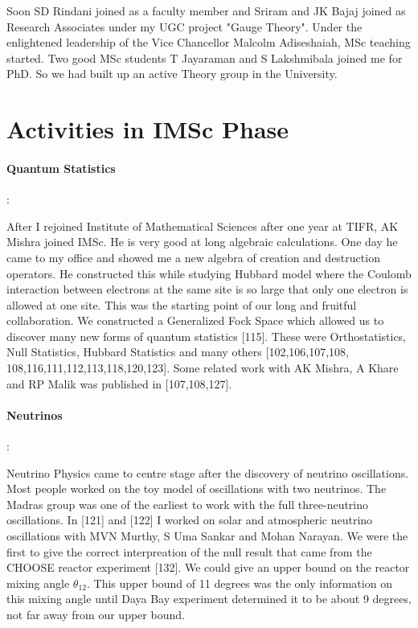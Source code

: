 Soon SD Rindani joined as a faculty member and Sriram and JK Bajaj 
joined as Research Associates under my UGC project "Gauge Theory". Under 
the enlightened leadership of the Vice Chancellor Malcolm Adiseshaiah, 
MSc teaching started. Two good MSc students T Jayaraman and S 
Lakshmibala joined me for PhD. So we had built up an active Theory group 
in the University.

\section*{Activities in IMSc Phase}

\paragraph{Quantum Statistics}:

After I rejoined Institute of Mathematical Sciences after one year at 
TIFR, AK Mishra joined IMSc. He is very good at long algebraic 
calculations. One day he came to my office and showed me a new algebra 
of creation and destruction operators. He constructed this while 
studying Hubbard model where the Coulomb interaction between electrons 
at the same site is so large that only one electron is allowed at one 
site. This was the starting point of our long and fruitful 
collaboration. We constructed a Generalized Fock Space which allowed us 
to discover many new forms of quantum statistics [115]. These were 
Orthostatistics, Null Statistics, Hubbard Statistics and many others 
[102,106,107,108, 108,116,111,112,113,118,120,123]. Some related work 
with AK Mishra, A Khare and RP Malik was published in [107,108,127].

\paragraph{Neutrinos}:

Neutrino Physics came to centre stage after the discovery of neutrino 
oscillations. Most people worked on the toy model of oscillations with 
two neutrinos. The Madras group was one of the earliest to work with the 
full three-neutrino oscillations. In [121] and [122] I worked on solar 
and atmospheric neutrino oscillations with MVN Murthy, S Uma Sankar and 
Mohan Narayan. We were the first to give the correct interpreation of 
the null result that came from the CHOOSE reactor experiment [132]. We 
could give an upper bound on the reactor mixing angle $\theta_{12}$. This 
upper bound of 11 degrees was the only information on this mixing angle 
until Daya Bay experiment determined it to be about 9 degrees, not 
far away from our upper bound.

